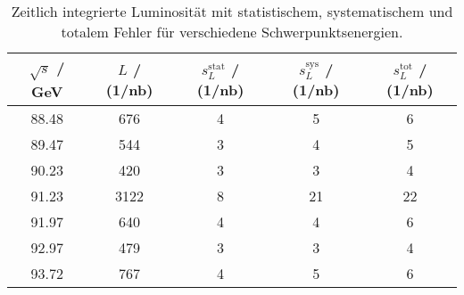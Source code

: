 \begin{table}[H]
\caption{Zeitlich integrierte Luminosität mit statistischem, systematischem und totalem Fehler für verschiedene Schwerpunktsenergien.}
\begin{center}
\begin{tabular}{|c|c|c|c|c|}
  \hline
  $\sqrt{s}$ / GeV & $L$ / (1/nb) & $s_L^\text{stat}$ / (1/nb) & $s_L^\text{sys}$ / (1/nb) & $s_L^\text{tot}$ / (1/nb) \\ \hline
  88.48 & 676 & 4 & 5 & 6 \\ \hline
  89.47 & 544 & 3 & 4 & 5 \\ \hline
  90.23 & 420 & 3 & 3 & 4 \\ \hline
  91.23 & 3122 & 8 & 21 & 22 \\ \hline
  91.97 & 640 & 4 & 4 & 6 \\ \hline
  92.97 & 479 & 3 & 3 & 4 \\ \hline
  93.72 & 767 & 4 & 5 & 6 \\ \hline
\end{tabular}
\end{center}
\label{tab:lums}
\end{table}
